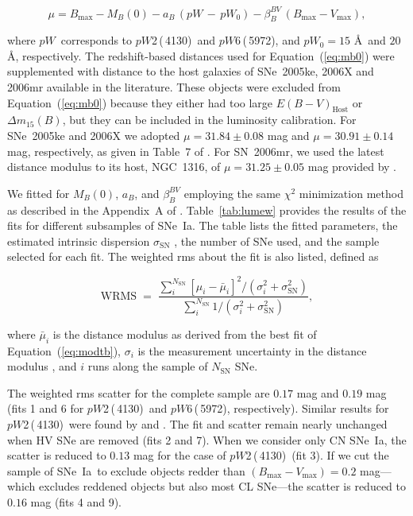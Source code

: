 \documentclass[apj]{emulateapj-rtx4}
\newcommand{\ew}{$pW$}
\newcommand{\pwtwo}{$pW$2\,(\ion{Si}{2}\,4130)}
\newcommand{\pwsix}{$pW$6\,(\ion{Si}{2}\,5972)}
\newcommand{\dm}{$\Delta m_{15}(B)$}
\newcommand{\sneia}{SNe~Ia}
\begin{document}
\begin{equation}
\label{eq:modtb}
\mu=B_{\mathrm{max}}-M_B(0)-a_B\,(pW\,-\,pW_0)-\beta_B^{BV}\,(B_{\mathrm{max}}-V_{\mathrm{max}}),
\end{equation}

\noindent where \ew\ corresponds to \pwtwo\ and \pwsix, and $pW_0=15$ \AA\
and $20$ \AA, respectively. The redshift-based distances used for
Equation~(\ref{eq:mb0}) were supplemented with distance to the host
galaxies of SNe~2005ke, 2006X and 2006mr available in the literature.
These objects were excluded from Equation~(\ref{eq:mb0}) because they
either had too large $E(B-V)_{\mathrm{Host}}$ or \dm, but they can be
included in the luminosity calibration. For SNe~2005ke and 2006X we adopted  
  $\mu=31.84 \pm 0.08$ mag and $\mu=30.91 \pm 0.14$ mag, respectively,
  as given in Table~7 of \citet{folatelli10}. For SN~2006mr, we used
  the latest distance modulus to its host, NGC~1316, of $\mu = 31.25
  \pm 0.05$ mag provided by \citet{stritzinger10}.

We fitted for $M_B(0)$, $a_B$, and
$\beta_B^{BV}$ employing the same $\chi^2$ minimization method as
described in the Appendix~A of
\citet{folatelli10}. Table~\ref{tab:lumew} provides the results of the
fits for different subsamples of \sneia. The table lists the fitted
parameters, the estimated intrinsic dispersion $\sigma_{\mathrm{SN}}$ 
\citep[see Appendix~A of][]{folatelli10}, the number of SNe used,
and the sample selected for each fit. The weighted rms about the fit
is also listed, defined as

\begin{equation}
\label{eq:wrms}
\mathrm{WRMS}\;=\;\frac{\sum_i^{N_{\mathrm{SN}}}\left[\mu_i-\bar{\mu}_i\right]^2/(\sigma_i^2+\sigma_{\mathrm{SN}}^2)}{\sum_i^{N_{\mathrm{SN}}}
  1/(\sigma_i^2+\sigma_{\mathrm{SN}}^2)},
\end{equation}

\noindent where $\bar{\mu}_i$ is the distance modulus as derived from
the best fit of Equation~(\ref{eq:modtb}), $\sigma_i$ is the
measurement uncertainty in the distance modulus 
\citep[see Appendix~A of][]{folatelli10}, and $i$ runs along the
sample of $N_{\mathrm{SN}}$ SNe. 

The weighted rms scatter for the complete sample are
$0.17$ mag and $0.19$ mag (fits 1 and 6 for \pwtwo\ and
\pwsix, respectively). Similar results for \pwtwo\ were found by
\citet{blondin11a} and \citet{silverman12c}. The fit and scatter
remain nearly unchanged when HV SNe are removed (fits 2 and 7). When
we consider only CN \sneia, the scatter is reduced to $0.13$
mag for the case of \pwtwo\ (fit 3). If we cut the sample of
\sneia\ to exclude objects redder than
$(B_{\mathrm{max}}-V_{\mathrm{max}})=0.2$ mag---which 
excludes reddened objects but also most CL SNe---the scatter is
reduced to $0.16$ mag (fits 4 and 9).
\end{document}
